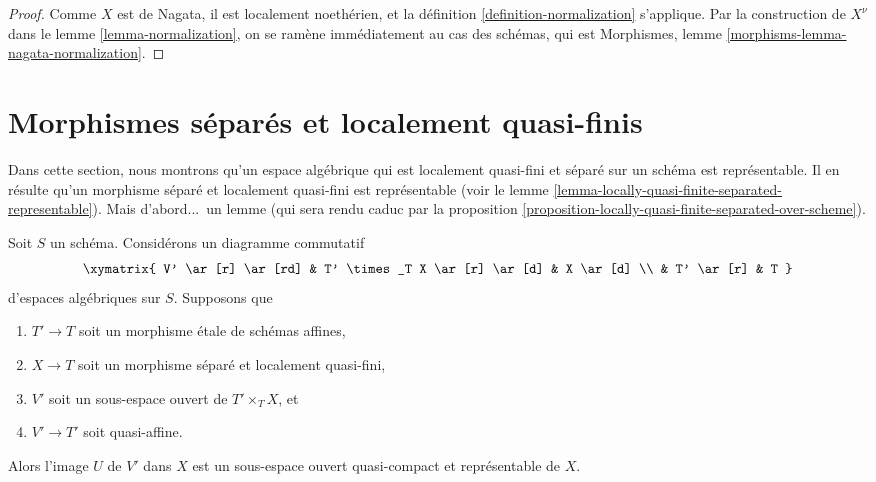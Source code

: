 \begin{proof}
Comme $X$ est de Nagata, il est localement noethérien,
et la définition \ref{definition-normalization} s'applique.
Par la construction de $X^\nu$ dans le lemme \ref{lemma-normalization},
on se ramène immédiatement au cas des schémas, qui est
Morphismes, lemme \ref{morphisms-lemma-nagata-normalization}.
\end{proof}












\section{Morphismes séparés et localement quasi-finis}
\label{section-schemehood}

\noindent
Dans cette section, nous montrons qu'un espace algébrique qui est localement
quasi-fini et séparé sur un schéma est représentable. Il en résulte
qu'un morphisme séparé et localement quasi-fini est
représentable (voir le
lemme \ref{lemma-locally-quasi-finite-separated-representable}).
Mais d'abord...\ un lemme (qui sera rendu caduc par la
proposition \ref{proposition-locally-quasi-finite-separated-over-scheme}).

\begin{lemma}
\label{lemma-neighbourhood-scheme}
Soit $S$ un schéma. Considérons un diagramme commutatif
$$
\xymatrix{
V' \ar[r] \ar[rd] & T' \times_T X \ar[r] \ar[d] & X \ar[d] \\
& T' \ar[r] & T
}
$$
d'espaces algébriques sur $S$. Supposons que
\begin{enumerate}
\item $T' \to T$ soit un morphisme étale de schémas affines,
\item $X \to T$ soit un morphisme séparé et localement quasi-fini,
\item $V'$ soit un sous-espace ouvert de $T' \times_T X$, et
\item $V' \to T'$ soit quasi-affine.
\end{enumerate}
Alors l'image $U$ de $V'$ dans $X$ est un sous-espace ouvert
quasi-compact et représentable de $X$.
\end{lemma}

